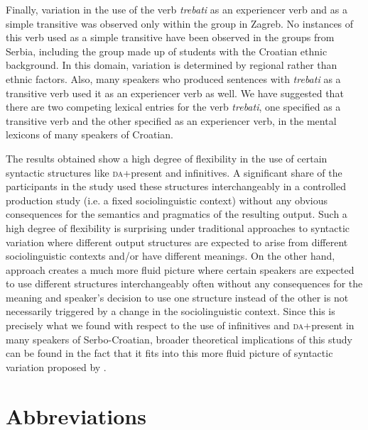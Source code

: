 \documentclass[output=paper,modfonts,newtxmath,hidelinks,]{langscibook}
\begin{document}
Finally, variation in the use of the verb \textit{trebati} as an experiencer verb and as a simple transitive was observed only within the group in Zagreb. No instances of this verb used as a simple transitive have been observed in the groups from Serbia, including the group made up of students with the Croatian ethnic background. In this domain, variation is determined by regional rather than ethnic factors. Also, many speakers who produced sentences with \textit{trebati} as a transitive verb used it as an experiencer verb as well. We have suggested that there are two competing lexical entries for the verb \textit{trebati}, one specified as a transitive verb and the other specified as an experiencer verb, in the mental lexicons of many speakers of Croatian. 

The results obtained show a high degree of flexibility in the use of certain syntactic structures like \textsc{da}+present and infinitives. A significant share of the participants in the study used these structures interchangeably in a controlled production study (i.e. a fixed sociolinguistic context) without any obvious consequences for the semantics and pragmatics of the resulting output. Such a high degree of flexibility is surprising under traditional approaches to syntactic variation where different output structures are expected to arise from different sociolinguistic contexts and/or have different meanings. On the other hand,  approach creates a much more fluid picture where certain speakers are expected to use different structures interchangeably often without any consequences for the meaning and speaker’s decision to use one structure instead of the other is not necessarily triggered by a change in the sociolinguistic context. Since this is precisely what we found with respect to the use of infinitives and \textsc{da}+present in many speakers of Serbo-Croatian, broader theoretical implications of this study can be found in the fact that it fits into this more fluid picture of syntactic variation proposed by \citet{Adger2006}.


\section*{Abbreviations}
\end{document}
